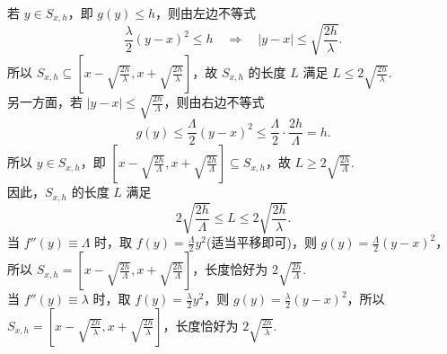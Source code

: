 \begin{enumerate}
\begin{solution}
        若 \(y \in S_{x,h}\)，即 \(g(y) \leq h\)，则由左边不等式
        \[
        \frac{\lambda}{2} (y - x)^2 \leq h \quad \Rightarrow \quad |y - x| \leq \sqrt{\frac{2h}{\lambda}}.
        \]
        所以 \(\displaystyle S_{x,h} \subseteq \left[ x - \sqrt{\frac{2h}{\lambda}}, x + \sqrt{\frac{2h}{\lambda}} \right]\)，故 \(S_{x,h}\) 的长度 \(L\) 满足 \(\displaystyle L \leq 2 \sqrt{\frac{2h}{\lambda}}\).\\
        另一方面，若 \(\displaystyle |y - x| \leq \sqrt{\frac{2h}{\Lambda}}\)，则由右边不等式
        \[
        g(y) \leq \frac{\Lambda}{2} (y - x)^2 \leq \frac{\Lambda}{2} \cdot \frac{2h}{\Lambda} = h.
        \]
        所以 \(y \in S_{x,h}\)，即 \(\displaystyle \left[ x - \sqrt{\frac{2h}{\Lambda}}, x + \sqrt{\frac{2h}{\Lambda}} \right] \subseteq S_{x,h}\)，故 \(\displaystyle L \geq 2 \sqrt{\frac{2h}{\Lambda}}\).\\
        因此，\(S_{x,h}\) 的长度 \(L\) 满足
        \[
        2 \sqrt{\frac{2h}{\Lambda}} \leq L \leq 2 \sqrt{\frac{2h}{\lambda}}.
        \]
        当 \(f''(y) \equiv \Lambda\) 时，取 \(\displaystyle f(y) = \frac{\Lambda}{2} y^2\)(适当平移即可)，则 \(\displaystyle g(y) = \frac{\Lambda}{2} (y - x)^2\)，所以 \(\displaystyle S_{x,h} = \left[ x - \sqrt{\frac{2h}{\Lambda}}, x + \sqrt{\frac{2h}{\Lambda}} \right]\)，长度恰好为 \(\displaystyle 2 \sqrt{\frac{2h}{\Lambda}}\). \\
        当 \(f''(y) \equiv \lambda\) 时，取 \(\displaystyle f(y) = \frac{\lambda}{2} y^2\)，则 \(\displaystyle g(y) = \frac{\lambda}{2} (y - x)^2\)，所以 \(\displaystyle S_{x,h} = \left[ x - \sqrt{\frac{2h}{\lambda}}, x + \sqrt{\frac{2h}{\lambda}} \right]\)，长度恰好为 \(\displaystyle 2 \sqrt{\frac{2h}{\lambda}}\).
    \end{solution}


\end{enumerate}
